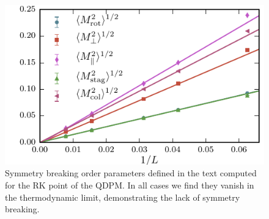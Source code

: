 \documentclass[twocolumn,prb,aps,floatfix,superscriptaddress]{revtex4-1}
\begin{document}
\begin{figure}[t!]
    \centering
    \includegraphics[width=1.0\linewidth]{order_params_plot.pdf}
    \caption{Symmetry breaking order parameters defined in the text computed for the RK point of the QDPM. In all cases we find they vanish in the thermodynamic limit, demonstrating the lack of symmetry breaking.}
    \label{fig:order_params}
\end{figure}

\FloatBarrier



\end{document}
